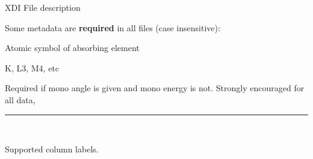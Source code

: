 \documentclass[final]{beamer}
\newcommand{\Color}[2]{{\textcolor{#1}{#2}}}
\newcommand{\Blue}[1]{{\Color{Blue}{\bf{#1}}}}
\begin{document}
\begin{frame}{}
\begin{columns}[t]
\begin{column}{.44\linewidth}
        \vspace{2mm}
        \begin{block}{\large XDI File description}

          \justifying
          Some metadata are \textbf{required} in all files (case insensitive):

         \begin{center}
           \begin{minipage}[t]{0.95\linewidth}
             \begin{description}[Mono]
             \item[\Blue{Element.symbol}]  Atomic symbol of absorbing element
             \item[\Blue{Element.edge}]    K, L3, M4, etc
             \item[\Blue{Mono.d\_spacing}]  Required if mono angle is given and mono energy is not.
               Strongly encouraged for all data,
             \end{description}
           \end{minipage}
         \end{center}

         \vspace{3mm}

          \hrule

          \vspace{3mm} {\ }

          Supported column labels.


\end{block}
\end{column}
\end{columns}
\end{frame}
\end{document}
